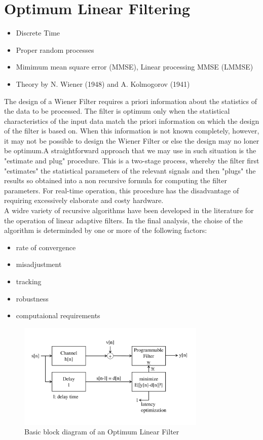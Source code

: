 \section{Optimum Linear Filtering}
\begin{itemize}
	\item Discrete Time
	\item Proper random processes
	\item Mimimum mean square error (MMSE), Linear processing MMSE (LMMSE)
	\item Theory by N. Wiener (1948) and A. Kolmogorov (1941)
\end{itemize}
The design of a Wiener Filter requires a priori information about the statistics of the data to be processed. The filter is optimum only when the statistical characteristics of the input data match the priori information on which the design of the filter is based on. When this information is not known completely, however, it may not be possible to design the Wiener Filter or else the design may no loner be optimum.A straightforward approach that we may use in such situation is the "estimate and plug" procedure. This is a two-stage process, whereby the filter first "estimates" the statistical parameters of the relevant signals and then "plugs" the results so obtained into a non recursive formula for computing the filter parameters. For real-time operation, this procedure has the disadvantage of requiring excessively elaborate and costy hardware. \\
A widre variety of recursive algorithms have been developed in the literature for the operation of linear adaptive filters. In the final analysis, the choise of the algorithm is determinded by one or more of the following factors: 
\begin{itemize}
	\item rate of convergence
	\item misadjustment
	\item tracking
	\item robustness
	\item computaional requirements
\end{itemize}
\begin{figure}[htbp]
	\centering
		\includegraphics[width=0.80\textwidth, trim =1cm 2cm 1cm 2cm,clip ]{graphics/Optimum_filter_block_diagram.pdf}
	\caption{Basic block diagram of an Optimum Linear Filter}
	\label{fig:Optimum_filter_block_diagram}
\end{figure}

